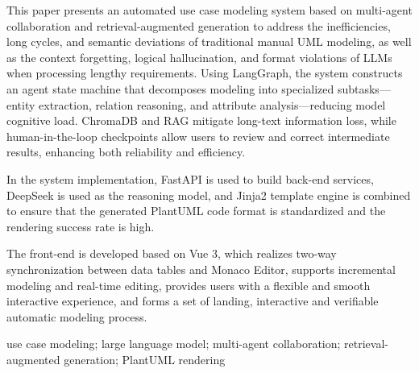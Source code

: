\begin{abstractENG}

    This paper presents an automated use case modeling system based on multi-agent collaboration and retrieval-augmented generation to address the inefficiencies, long cycles, and semantic deviations of traditional manual UML modeling, as well as the context forgetting, logical hallucination, and format violations of LLMs when processing lengthy requirements. Using LangGraph, the system constructs an agent state machine that decomposes modeling into specialized subtasks—entity extraction, relation reasoning, and attribute analysis—reducing model cognitive load. ChromaDB and RAG mitigate long-text information loss, while human-in-the-loop checkpoints allow users to review and correct intermediate results, enhancing both reliability and efficiency.
    
    In the system implementation, FastAPI is used to build back-end services, DeepSeek is used as the reasoning model, and Jinja2 template engine is combined to ensure that the generated PlantUML code format is standardized and the rendering success rate is high. 

    The front-end is developed based on Vue 3, which realizes two-way synchronization between data tables and Monaco Editor, supports incremental modeling and real-time editing, provides users with a flexible and smooth interactive experience, and forms a set of landing, interactive and verifiable automatic modeling process.

    \keywordsENG use case modeling; large language model; multi-agent collaboration; retrieval-augmented generation; PlantUML rendering
\end{abstractENG}

